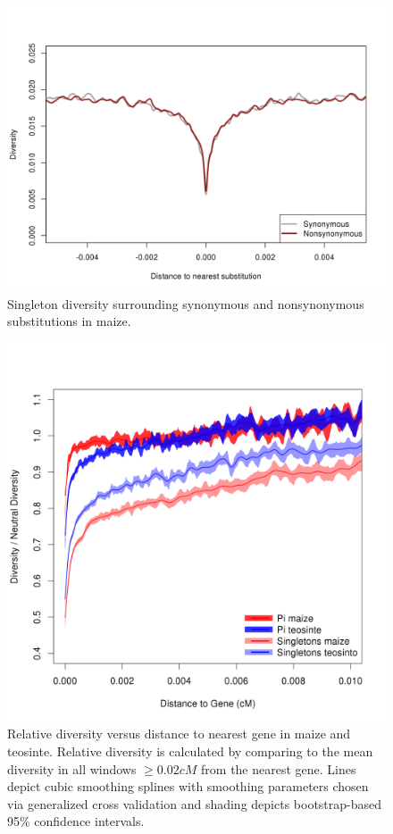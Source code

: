 \documentclass{pnastwo}
\begin{document}
\begin{article}
\begin{figure}
  \includegraphics[width=\textwidth]{FigsAndFiles/plotDiversity_TvM_Singletons.png}
\caption{ Singleton diversity surrounding synonymous and nonsynonymous
  substitutions in maize. \label{sFig:singleton}}
\end{figure}
\clearpage


\begin{figure}
  \includegraphics[width=\textwidth]{FigsAndFiles/distanceToGene_WithSignificance_Folded2_maizeAndTeoSingleVsPi.png}
\caption{ Relative diversity versus distance to nearest gene in maize and teosinte. Relative diversity is calculated by comparing to the mean diversity in all windows $\geq 0.02 cM$ from the nearest gene. Lines depict cubic smoothing splines with smoothing parameters chosen via generalized cross validation and shading depicts bootstrap-based 95\% confidence intervals.  \label{sFig:singletonPi}}
\end{figure}
\clearpage



\end{article}
\end{document}
